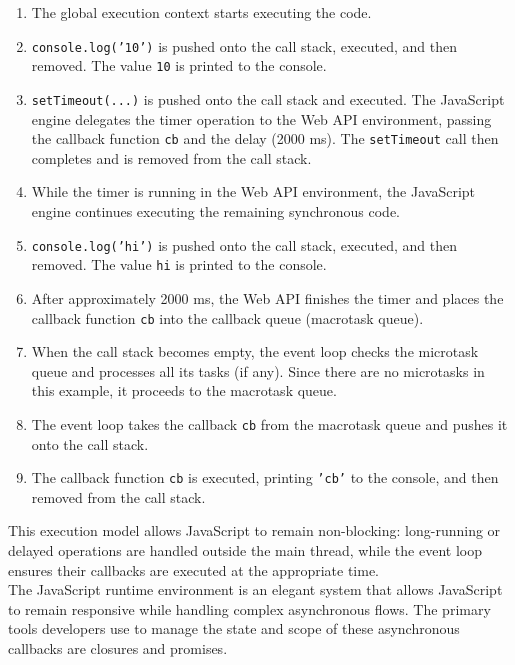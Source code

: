 \documentclass{scrbook}
\begin{document}
\begin{enumerate}
    \item The global execution context starts executing the code.

    \item \texttt{console.log('10')} is pushed onto the call stack, executed, and then removed. The value \texttt{10} is printed to the console.

    \item \texttt{setTimeout(...)} is pushed onto the call stack and executed. The JavaScript engine delegates the timer operation to the Web API environment, passing the callback function \texttt{cb} and the delay (2000 ms). The \texttt{setTimeout} call then completes and is removed from the call stack.

    \item While the timer is running in the Web API environment, the JavaScript engine continues executing the remaining synchronous code.

    \item \texttt{console.log('hi')} is pushed onto the call stack, executed, and then removed. The value \texttt{hi} is printed to the console.

    \item After approximately 2000 ms, the Web API finishes the timer and places the callback function \texttt{cb} into the callback queue (macrotask queue).

    \item When the call stack becomes empty, the event loop checks the microtask queue and processes all its tasks (if any). Since there are no microtasks in this example, it proceeds to the macrotask queue.

    \item The event loop takes the callback \texttt{cb} from the macrotask queue and pushes it onto the call stack.

    \item The callback function \texttt{cb} is executed, printing \texttt{'cb'} to the console, and then removed from the call stack.
\end{enumerate}

This execution model allows JavaScript to remain non-blocking: long-running or delayed operations are handled outside the main thread, while the event loop ensures their callbacks are executed at the appropriate time.\\

The JavaScript runtime environment is an elegant system that allows JavaScript to remain responsive while handling complex asynchronous flows. The primary tools developers use to manage the state and scope of these asynchronous callbacks are closures and promises.
\end{document}
